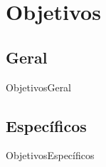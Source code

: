 \section{Objetivos}

\subsection{Geral}
\begin{frame}{Objetivos}{Geral}

\end{frame}

\subsection{Específicos}
\begin{frame}{Objetivos}{Específicos}

\end{frame}